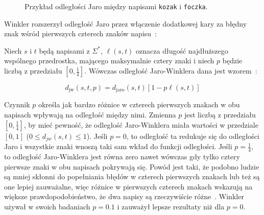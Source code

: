 \documentclass{praca1}
\begin{document}
\begin{figure}[width=80pt]
\centering
{}
\cprotect\caption{Przykład odległości Jaro między napisami \verb|kozak| i \verb|foczka|.}\label{rys:005}
\end{figure}


Winkler rozszerzył odległość Jaro przez włączenie dodatkowej kary za błędny znak wśród pierwszych czterech znaków napisu~\cite{Loo2014:stringdist}:

\begin{definition}
Niech $s$ i $t$ będą napisami z $\Sigma^*$, $\ell(s,t)$ oznacza długość najdłuższego wspólnego przedrostka, mającego maksymalnie cztery znaki i niech $p$ będzie liczbą z przedziału $[0, \frac{1}{4}]$. Wówczas odległość Jaro-Winklera dana jest wzorem~\cite{Winkler1990:stringcomparator}:

\begin{equation}
\label{eq:012}
d_{\mathrm{jw}}(s,t, p) = d_{\mathrm{jaro}}(s,t)[1 - p\ell(s,t)]
\end{equation}
\end{definition}

Czynnik $p$ określa jak bardzo różnice w czterech pierwszych znakach w obu napisach wpływają na odległość między nimi. Zmienna $p$ jest liczbą z przedziału $[0, \frac{1}{4}]$, by mieć pewność, że odległość Jaro-Winklera miała wartości w przedziale $[0,1]$ ($0 \leq d_{jw}(s,t) \leq 1$). Jeśli $p=0$, to odległość ta redukuje się do odległości Jaro i wszystkie znaki wnoszą taki sam wkład do funkcji odległości. Jeśli $p = \frac{1}{4}$, to odległość Jaro-Winklera jest równa zero nawet wówczas gdy tylko cztery pierwsze znaki w obu napisach pokrywają się. Powód jest taki, że podobno ludzie są mniej skłonni do popełniania błędów w czterech pierwszych znakach lub też są one lepiej zauważalne, więc różnice w pierwszych czterech znakach wskazują na większe prawdopodobieństwo, że dwa napisy są rzeczywiście różne~\cite{Loo2014:stringdist}. Winkler~\cite{Winkler1990:stringcomparator} używał w swoich badaniach $p = 0.1$ i zauważył lepsze rezultaty niż dla $p = 0$.
\end{document}

